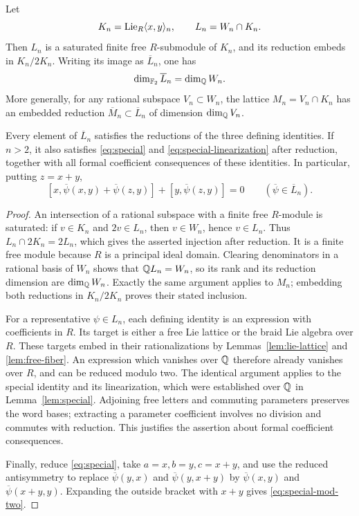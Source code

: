 \begin{proposition}\label{prop:saturated-reduction}
Let
\[
 K_n=\operatorname{Lie}_R\langle x,y\rangle_n,
 \qquad L_n=W_n\cap K_n.
\]
Then \(L_n\) is a saturated finite free \(R\)-submodule of \(K_n\),
and its reduction embeds in \(K_n/2K_n\).  Writing its image as
\(\overline L_n\), one has
\begin{equation}\label{eq:saturated-dimension}
 \dim_{{\mathbb F_2}}\overline L_n=\dim_{\mathbb Q}W_n.
\end{equation}
More generally, for any rational subspace \(V_n\subset W_n\), the
lattice \(M_n=V_n\cap K_n\) has an embedded reduction
\(\overline M_n\subset\overline L_n\) of dimension
\(\dim_{\mathbb Q}V_n\).

Every element of \(\overline L_n\) satisfies the reductions of the
three defining identities.  If \(n>2\), it also satisfies
\eqref{eq:special} and \eqref{eq:special-linearization} after
reduction, together with all formal coefficient consequences of
these identities.  In particular, putting \(z=x+y\),
\begin{equation}\label{eq:special-mod-two}
 [x,\overline\psi(x,y)+\overline\psi(z,y)]
       +[y,\overline\psi(z,y)]=0
 \qquad(\overline\psi\in\overline L_n).
\end{equation}
\end{proposition}
\begin{proof}
An intersection of a rational subspace with a finite free
\(R\)-module is saturated: if \(v\in K_n\) and \(2v\in L_n\),
then \(v\in W_n\), hence \(v\in L_n\).  Thus
\(L_n\cap2K_n=2L_n\), which gives the asserted injection after
reduction.  It is a finite free module because \(R\) is a principal
ideal domain.  Clearing denominators in a rational basis of
\(W_n\) shows that \(\mathbb Q L_n=W_n\), so its rank and its reduction
dimension are \(\dim_{\mathbb Q}W_n\).  Exactly the same argument applies
to \(M_n\); embedding both reductions in \(K_n/2K_n\) proves their
stated inclusion.

For a representative \(\psi\in L_n\), each defining identity is
an expression with coefficients in \(R\).  Its target is either a
free Lie lattice or the braid Lie algebra over \(R\).  These targets
embed in their rationalizations by Lemmas~\ref{lem:lie-lattice} and
\ref{lem:free-fiber}.  An expression which vanishes over \(\mathbb Q\)
therefore already vanishes over \(R\), and can be reduced modulo
two.  The identical argument applies to the special identity and
its linearization, which were established over \(\mathbb Q\) in
Lemma~\ref{lem:special}.  Adjoining free letters and commuting
parameters preserves the word bases; extracting a parameter
coefficient involves no division and commutes with reduction.
This justifies the assertion about formal coefficient consequences.

Finally, reduce \eqref{eq:special}, take \(a=x,b=y,c=x+y\), and
use the reduced antisymmetry to replace \(\overline\psi(y,x)\)
and \(\overline\psi(y,x+y)\) by
\(\overline\psi(x,y)\) and \(\overline\psi(x+y,y)\).
Expanding the outside bracket with \(x+y\) gives
\eqref{eq:special-mod-two}.
\end{proof}

